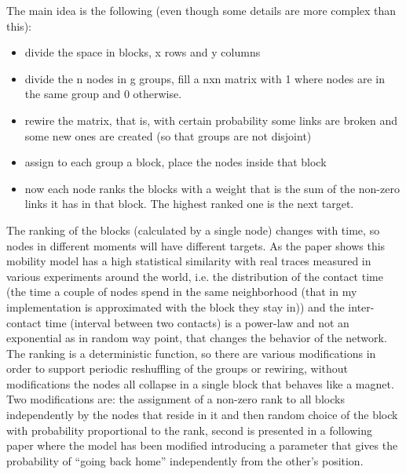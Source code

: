 \documentclass[12pt, a4]{article}
\theoremstyle{definition}
\begin{document}
The main idea is the following (even though some details are more complex than this):

\begin{itemize}
\item    divide the space in blocks, x rows and y columns
\item    divide the n nodes in g groups, fill a nxn matrix with 1 where nodes are in the same group and 0 otherwise.
\item    rewire the matrix, that is, with certain probability some links are broken and some new ones are created (so that groups are not disjoint)
\item    assign to each group a block, place the nodes inside that block
\item    now each node ranks the blocks with a weight that is the sum of the non-zero links it has in that block. The highest ranked one is the next target.
\end{itemize}

The ranking of the blocks (calculated by a single node) changes with time, so
nodes in different moments will have different targets. As the paper shows this
mobility model has a high statistical similarity with real traces measured in
various experiments around the world, i.e. the distribution of the contact time
(the time a couple of nodes spend in the same neighborhood (that in my
implementation is approximated with the block they stay in)) and the
inter-contact time (interval between two contacts) is a power-law and not an
exponential as in random way point, that changes the behavior of the network.
The ranking is a deterministic function, so there are various modifications in
order to support periodic reshuffling of the groups or rewiring, without
modifications the nodes all collapse in a single block that behaves like a
magnet. Two modifications are: the assignment of a non-zero rank to all blocks
independently by the nodes that reside in it and then random choice of the block
with probability proportional to the rank, second is presented in a following
paper where the model has been modified introducing a parameter that gives the
probability of “going back home” independently from the other’s position.
\end{document}
